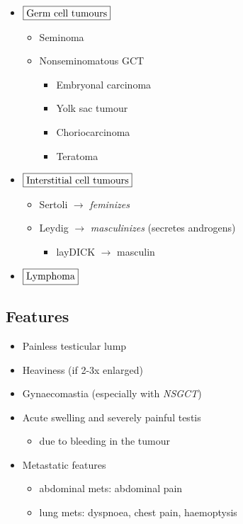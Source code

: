 \documentclass[
  14pt,
]{memoir}
\providecommand{\tightlist}{%
  \setlength{\itemsep}{0pt}\setlength{\parskip}{0pt}}
\begin{document}
\begin{itemize}
\tightlist
\item
  \(\fbox{Germ cell tumours}\)

  \begin{itemize}
  \tightlist
  \item
    Seminoma
  \item
    Nonseminomatous GCT

    \begin{itemize}
    \tightlist
    \item
      Embryonal carcinoma
    \item
      Yolk sac tumour
    \item
      Choriocarcinoma
    \item
      Teratoma
    \end{itemize}
  \end{itemize}
\item
  \(\fbox{Interstitial cell tumours}\)

  \begin{itemize}
  \tightlist
  \item
    Sertoli \(\rightarrow\) \emph{feminizes}
  \item
    Leydig \(\rightarrow\) \emph{masculinizes} (secretes androgens)

    \begin{itemize}
    \tightlist
    \item
      layDICK \(\rightarrow\) masculin
    \end{itemize}
  \end{itemize}
\item
  \(\fbox{Lymphoma}\)
\end{itemize}

\hypertarget{features-9}{%
\subsection{Features}\label{features-9}}

\begin{itemize}
\tightlist
\item
  Painless testicular lump
\item
  Heaviness (if 2-3x enlarged)
\item
  Gynaecomastia (especially with \emph{NSGCT})
\item
  Acute swelling and severely painful testis

  \begin{itemize}
  \tightlist
  \item
    due to bleeding in the tumour
  \end{itemize}
\item
  Metastatic features

  \begin{itemize}
  \tightlist
  \item
    abdominal mets: abdominal pain
  \item
    lung mets: dyspnoea, chest pain, haemoptysis
  \end{itemize}
\end{itemize}
\end{document}
